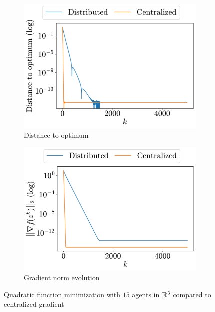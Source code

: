 \documentclass[a4paper,11pt,oneside]{book}
\begin{document}
\begin{figure}[H]
      \centering
      \begin{subfigure}[t]{0.48\linewidth}
            \centering
            \includegraphics[width=\linewidth]{./figs/quadratic/centralized/distance.pdf} 
            \caption{Distance to optimum}
      \end{subfigure}
      \hfill
      \begin{subfigure}[t]{0.48\linewidth}
            \centering
            \includegraphics[width=\linewidth]{./figs/quadratic/centralized/gradient.pdf} 
            \caption{Gradient norm evolution}
      \end{subfigure}
      \caption{Quadratic function minimization with $15$ agents in ${\mathbb{R}}^{3}$ compared to centralized gradient}
      \label{fig:quadratic_centralized_15_3}
\end{figure}
\end{document}
